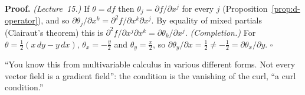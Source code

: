 \documentclass[11pt]{report}
\renewenvironment{proof}[1][Proof]{\noindent\textbf{#1.} }{\hfill$\square$\par\vspace{5pt}}
\begin{document}
\begin{proof}
\textit{(Lecture~15.)} If $\theta = df$ then $\theta_j = \partial f/\partial x^j$ for every $j$ (Proposition~\ref{prop:d-operator}), and so $\partial\theta_j/\partial x^k = \partial^2 f/\partial x^k \partial x^j$. By equality of mixed partials (Clairaut's theorem) this is $\partial^2 f/\partial x^j \partial x^k = \partial\theta_k/\partial x^j$. \textit{(Completion.)} For $\theta = \tfrac12(x\,dy - y\,dx)$, $\theta_x = -\tfrac{y}{2}$ and $\theta_y = \tfrac{x}{2}$, so $\partial\theta_y/\partial x = \tfrac12 \neq -\tfrac12 = \partial\theta_x/\partial y$.
\end{proof}

``You know this from multivariable calculus in various different forms. Not every vector field is a gradient field'': the condition is the vanishing of the curl, ``a curl condition.''
\end{document}
